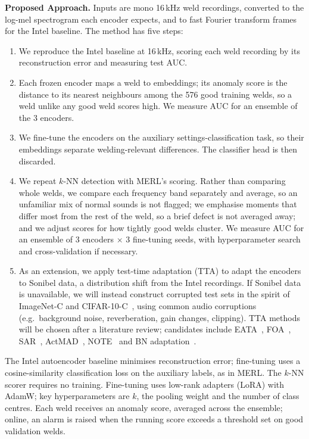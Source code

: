 \documentclass[11pt]{article}
\begin{document}
{\bf Proposed Approach.}
Inputs are mono 16\,kHz weld recordings, converted to the log-mel spectrogram each encoder expects, and to fast Fourier transform frames for the Intel baseline.
The method has five steps:
\begin{enumerate}[noitemsep]
    \item We reproduce the Intel baseline at 16\,kHz, scoring each weld recording by its reconstruction error and measuring test AUC.
    \item Each frozen encoder maps a weld to embeddings; its anomaly score is the distance to its nearest neighbours among the 576 good training welds, so a weld unlike any good weld scores high. We measure AUC for an ensemble of the 3 encoders.
    \item We fine-tune the encoders on the auxiliary settings-classification task, so their embeddings separate welding-relevant differences. The classifier head is then discarded.
    \item We repeat $k$-NN detection with MERL's scoring. Rather than comparing whole welds, we compare each frequency band separately and average, so an unfamiliar mix of normal sounds is not flagged; we emphasise moments that differ most from the rest of the weld, so a brief defect is not averaged away; and we adjust scores for how tightly good welds cluster. We measure AUC for an ensemble of 3 encoders $\times$ 3 fine-tuning seeds, with hyperparameter search and cross-validation if necessary.
    \item As an extension, we apply test-time adaptation (TTA) to adapt the encoders to Sonibel data, a distribution shift from the Intel recordings. If Sonibel data is unavailable, we will instead construct corrupted test sets in the spirit of ImageNet-C and CIFAR-10-C~\cite{imagenetc}, using common audio corruptions (e.g.\ background noise, reverberation, gain changes, clipping). TTA methods will be chosen after a literature review; candidates include EATA~\cite{eata}, FOA~\cite{foa}, SAR~\cite{sar}, ActMAD~\cite{actmad}, NOTE~\cite{note} and BN adaptation~\cite{bnadapt}.
\end{enumerate}
The Intel autoencoder baseline minimises reconstruction error; fine-tuning uses a cosine-similarity classification loss on the auxiliary labels, as in MERL. The $k$-NN scorer requires no training.
Fine-tuning uses low-rank adapters (LoRA) with AdamW; key hyperparameters are $k$, the pooling weight and the number of class centres.
Each weld receives an anomaly score, averaged across the ensemble; online, an alarm is raised when the running score exceeds a threshold set on good validation welds.
\end{document}
